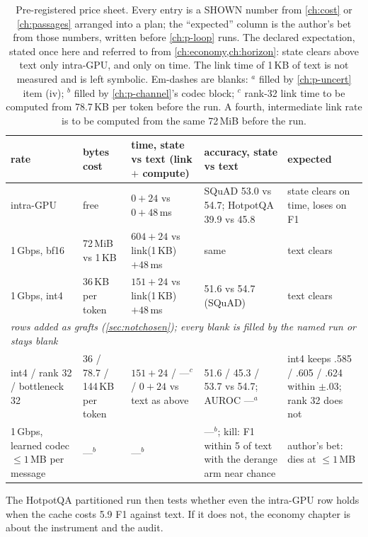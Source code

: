 \documentclass[11pt,a4paper]{report}
\begin{document}
\begin{table}[h]
\caption{Pre-registered price sheet. Every entry is a SHOWN number from \cref{ch:cost} or \cref{ch:passages} arranged into a plan; the ``expected'' column is the author's bet from those numbers, written before \cref{ch:p-loop} runs. The declared expectation, stated once here and referred to from \cref{ch:economy,ch:horizon}: state clears above text only intra-GPU, and only on time. The link time of 1\,KB of text is not measured and is left symbolic. Em-dashes are blanks: $^{a}$ filled by \cref{ch:p-uncert} item (iv); $^{b}$ filled by \cref{ch:p-channel}'s codec block; $^{c}$ rank-32 link time to be computed from 78.7\,KB per token before the run. A fourth, intermediate link rate is to be computed from the same 72\,MiB before the run.}
\label{tab:pricesheet}
\vskip 0.1in
\centering
\footnotesize
\begin{tabular}{p{1.9cm}p{2.2cm}p{3.2cm}p{4.2cm}p{2.6cm}}
\toprule
rate & bytes cost & time, state vs text (link $+$ compute) & accuracy, state vs text & expected \\
\midrule
intra-GPU & free & $0 + 24$ vs $0 + 48$\,ms & SQuAD 53.0 vs 54.7; HotpotQA 39.9 vs 45.8 & state clears on time, loses on F1 \\
1\,Gbps, bf16 & 72\,MiB vs 1\,KB & $604 + 24$ vs link(1\,KB) $+ 48$\,ms & same & text clears \\
1\,Gbps, int4 & 36\,KB per token & $151 + 24$ vs link(1\,KB) $+ 48$\,ms & 51.6 vs 54.7 (SQuAD) & text clears \\
\midrule
\multicolumn{5}{p{14.1cm}}{\emph{rows added as grafts (\cref{sec:notchosen}); every blank is filled by the named run or stays blank}} \\
int4 / rank 32 / bottleneck 32 & 36 / 78.7 / 144\,KB per token & $151 + 24$ / ---$^{c}$ / $0 + 24$ vs text as above & 51.6 / 45.3 / 53.7 vs 54.7; AUROC ---$^{a}$ & int4 keeps .585 / .605 / .624 within $\pm .03$; rank 32 does not \\
1\,Gbps, learned codec $\le 1$\,MB per message & ---$^{b}$ & ---$^{b}$ & ---$^{b}$; kill: F1 within 5 of text with the derange arm near chance & author's bet: dies at $\le 1$\,MB \\
\bottomrule
\end{tabular}
\end{table}

The HotpotQA partitioned run then tests whether even the intra-GPU row holds when the cache costs 5.9 F1 against text. If it does not, the economy chapter is about the instrument and the audit.
\end{document}
